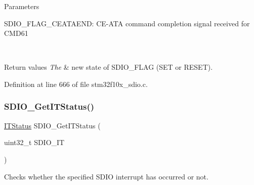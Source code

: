 \begin{DoxyParams}{Parameters}
\begin{DoxyItemize}
S\+D\+I\+O\+\_\+\+F\+L\+A\+G\+\_\+\+C\+E\+A\+T\+A\+E\+ND\+: C\+E-\/\+A\+TA command completion signal received for C\+M\+D61 \end{DoxyItemize}
\\
\hline
\end{DoxyParams}

\begin{DoxyRetVals}{Return values}
{\em The} & new state of S\+D\+I\+O\+\_\+\+F\+L\+AG (S\+ET or R\+E\+S\+ET). \\
\hline
\end{DoxyRetVals}


Definition at line 666 of file stm32f10x\+\_\+sdio.\+c.

\mbox{\label{group___s_d_i_o___private___functions_ga2d64af1f3df0f99cb518f9a89bbd02ac}} 
\subsubsection{\texorpdfstring{S\+D\+I\+O\+\_\+\+Get\+I\+T\+Status()}{SDIO\_GetITStatus()}}
{\footnotesize\ttfamily \hyperlink{group___exported__types_gaacbd7ed539db0aacd973a0f6eca34074}{I\+T\+Status} S\+D\+I\+O\+\_\+\+Get\+I\+T\+Status (\begin{DoxyParamCaption}\item[{uint32\+\_\+t}]{S\+D\+I\+O\+\_\+\+IT }\end{DoxyParamCaption})}



Checks whether the specified S\+D\+IO interrupt has occurred or not. 


